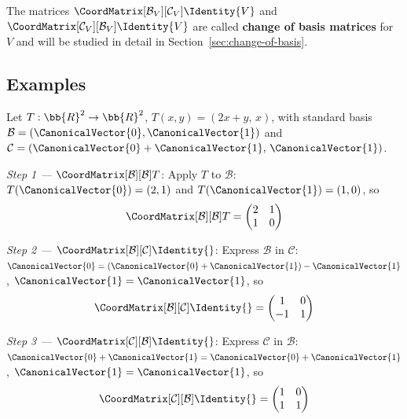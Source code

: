 \begin{remark}
    The matrices $\CoordMatrix[\mathcal{B}_V][\mathcal{C}_V]{\Identity{V}}$ and
    $\CoordMatrix[\mathcal{C}_V][\mathcal{B}_V]{\Identity{V}}$ are called
    \textbf{change of basis matrices} for $V$ and will be studied in detail in
    Section~\ref{sec:change-of-basis}.
\end{remark}

\subsection{Examples}

\begin{example}
\label{ex:cob-endomorphism}
    Let $T: \bb{R}^2 \to \bb{R}^2$, $T(x,y) = (2x + y,\, x)$, with standard basis
    $\mathcal{B} = (\CanonicalVector{0}, \CanonicalVector{1})$ and $\mathcal{C} = (\CanonicalVector{0} + \CanonicalVector{1},\, \CanonicalVector{1})$.

    \textit{Step 1 --- $\CoordMatrix[\mathcal{B}][\mathcal{B}]{T}$}: Apply $T$ to $\mathcal{B}$:
    $T(\CanonicalVector{0}) = (2,1)$ and $T(\CanonicalVector{1}) = (1,0)$, so
    \[
        \CoordMatrix[\mathcal{B}][\mathcal{B}]{T}
        = \begin{pmatrix} 2 & 1 \\ 1 & 0 \end{pmatrix}
    \]

    \textit{Step 2 --- $\CoordMatrix[\mathcal{B}][\mathcal{C}]{\Identity{}}$}: Express
    $\mathcal{B}$ in $\mathcal{C}$: $\CanonicalVector{0} = (\CanonicalVector{0}+\CanonicalVector{1}) - \CanonicalVector{1}$, $\CanonicalVector{1} = \CanonicalVector{1}$, so
    \[
        \CoordMatrix[\mathcal{B}][\mathcal{C}]{\Identity{}}
        = \begin{pmatrix} 1 & 0 \\ -1 & 1 \end{pmatrix}
    \]

    \textit{Step 3 --- $\CoordMatrix[\mathcal{C}][\mathcal{B}]{\Identity{}}$}: Express
    $\mathcal{C}$ in $\mathcal{B}$: $\CanonicalVector{0}+\CanonicalVector{1} = \CanonicalVector{0}+\CanonicalVector{1}$, $\CanonicalVector{1} = \CanonicalVector{1}$, so
    \[
        \CoordMatrix[\mathcal{C}][\mathcal{B}]{\Identity{}}
        = \begin{pmatrix} 1 & 0 \\ 1 & 1 \end{pmatrix}
    \]


\end{example}
